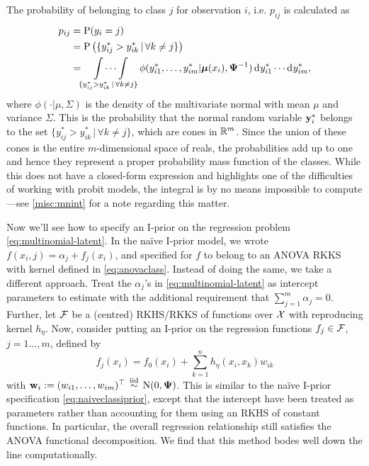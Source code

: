 \newcommand{\intset}{\{y_{ij}^* > y_{ik}^* \,|\, \forall k \neq j\}}
The probability of belonging to class $j$ for observation $i$, i.e. $p_{ij}$ is calculated as
\begin{align}
  p_{ij} 
  &= \Prob(y_i = j) \nonumber \\
  &= \Prob\big(\intset\big) \nonumber \\
  &= \idotsint\displaylimits_{\intset} \phi(y_{i1}^*, \dots, y_{im}^*|\bmu(x_i), \bPsi^{-1}) \dint y_{i1}^* \cdots \dint y_{im}^*,\label{eq:pij}
\end{align}
where $\phi(\cdot|\mu,\Sigma)$ is the density of the multivariate normal with mean $\mu$ and variance $\Sigma$.
This is the probability that the normal random variable ${\mathbf y}_i^*$ belongs to the set $\intset$, which are cones in $\mathbb{R}^m$.
Since the union of these cones is the entire $m$-dimensional space of reals, the probabilities add up to one and hence they represent a proper probability mass function of the classes.
While this does not have a closed-form expression and highlights one of the difficulties of working with probit models, the integral is by no means impossible to compute---see \cref{misc:mnint} for a note regarding this matter.


Now we'll see how to specify an I-prior on the regression problem \cref{eq:multinomial-latent}.
In the naïve I-prior model, we wrote $f(x_i,j) = \alpha_j + f_j(x_i)$, and specified for $f$ to belong to an ANOVA RKKS with kernel defined in \cref{eq:anovaclass}.
Instead of doing the same, we take a different approach.
Treat the $\alpha_j$'s in \cref{eq:multinomial-latent} as intercept parameters to estimate with the additional requirement that $\sum_{j=1}^m \alpha_j = 0$.
Further, let ${\mathcal F}$ be a (centred) RKHS/RKKS of functions over ${\mathcal X}$ with reproducing kernel $h_\eta$.
Now, consider putting an I-prior on the regression functions $f_j \in {\mathcal F}$, $j=1\dots,m$, defined by
\[
  f_j(x_i) = f_0(x_i) + \sum_{k=1}^n h_\eta(x_i,x_k)w_{ik}
\]
with ${\mathbf w}_i := (w_{i1},\dots,w_{im})^\top \,\overset{\text{iid}}{\sim}\, \operatorname{N}(0,{\bm\Psi})$.
This is similar to the naïve I-prior specification \cref{eq:naiveclassiprior}, except that the intercept  have been treated as parameters rather than accounting for them using an RKHS of constant functions.
In particular, the overall regression relationship still satisfies the ANOVA functional decomposition.
We find that this method bodes well down the line computationally.


